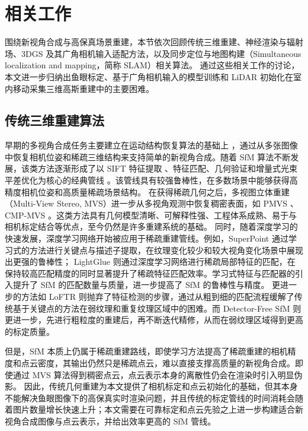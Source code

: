 \clearpage

\section{相关工作}

围绕新视角合成与高保真场景重建，本节依次回顾传统三维重建、神经渲染与辐射场、3DGS 及其广角相机输入适配方法，以及同步定位与地图构建（Simultaneous localization and mapping，简称 SLAM）相关算法。
通过这些相关工作的讨论，本文进一步归纳出鱼眼标定、基于广角相机输入的模型训练和 LiDAR 初始化在室内移动采集三维高斯重建中的主要困难。

\subsection{传统三维重建算法}

早期的多视角合成任务主要建立在运动结构恢复算法的基础上 \cite{snavely2006photo}，通过从多张图像中恢复相机位姿和稀疏三维结构来支持简单的新视角合成。随着 SfM 算法不断发展，该类方法逐渐形成了以 SIFT 特征提取 \cite{lowe2004sift}、特征匹配、几何验证和增量式光束平差优化为核心的经典管线 \cite{schonberger2016sfm}。该管线具有较强鲁棒性，在多数场景中能够获得高精度相机位姿和高质量稀疏场景结构。
在获得稀疏几何之后，多视图立体重建（Multi-View Stereo, MVS）进一步从多视角观测中恢复稠密表面，如 PMVS \cite{PMVS}、CMP-MVS \cite{jancosek2011multi}。这类方法具有几何模型清晰、可解释性强、工程体系成熟、易于与相机标定结合等优点，至今仍然是许多重建系统的基础。
同时，随着深度学习的快速发展，深度学习网络开始被应用于稀疏重建管线。例如，SuperPoint \cite{detone2018superpoint} 通过学习式的方法进行关键点与描述子提取，在纹理变化较少和较大视角变化场景中展现出更强的鲁棒性；
LightGlue \cite{lindenberger2023lightglue} 则通过深度学习网络进行稀疏局部特征的匹配，在保持较高匹配精度的同时显著提升了稀疏特征匹配效率。学习式特征与匹配器的引入提升了 SfM 的匹配数量与质量，进一步提高了 SfM 的鲁棒性与精度。
更进一步的方法如 LoFTR \cite{sun2021loftr} 则抛弃了特征检测的步骤，通过从粗到细的匹配流程缓解了传统基于关键点的方法在弱纹理和重复纹理区域中的困难。而 Detector-Free SfM \cite{he2024detector} 则更进一步，先进行粗粒度的重建后，再不断迭代精修，从而在弱纹理区域得到更高的标定质量。

但是，SfM 本质上仍属于稀疏重建路线，即使学习方法提高了稀疏重建的相机精度和点云密度，其输出仍然只是稀疏点云，难以直接支撑高质量的新视角合成。即使通过 MVS 算法得到稠密点云，点云表示本身的离散性仍会在渲染时引入明显伪影。
因此，传统几何重建为本文提供了相机标定和点云初始化的基础，但其本身不能解决鱼眼图像下的高保真实时渲染问题，并且传统的标定管线的时间消耗会随着图片数量增长快速上升；本文需要在可靠标定和点云先验之上进一步构建适合新视角合成图像与点云表示，并给出效率更高的 SfM 管线。

